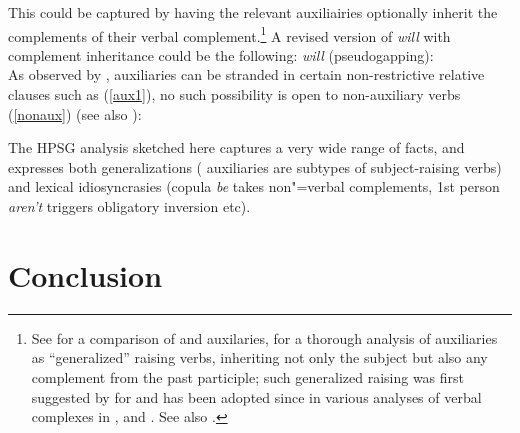 This could be captured by having the relevant auxiliairies optionally inherit the complements of their verbal complement.\footnote{See  for a comparison of  and  auxilaries,  for a thorough analysis of  auxiliaries as ``generalized'' raising verbs, inheriting not only the subject but also any complement from the past participle; such generalized raising was first suggested by \citet{HN89a,HN94a} for  and has been adopted since in various analyses of verbal complexes in  \citep{Kiss95a,Meurers2000b,Kathol2001a,Mueller99a,Mueller2002b},  \citep{BvN98a} and  \citep[Section~4]{MuellerPersian}. See also .}
A revised version of \emph{will} with complement inheritance could be the following:
\ea
\emph{will} (pseudogapping):\\
\z
As observed by \citet{ArnoldandBorsley2008}, auxiliaries can be stranded in certain non-restrictive
relative clauses such as (\ref{aux1}), no such possibility is open to non-auxiliary verbs
(\ref{nonaux}) (see also \crossrefchapteralt[\page \pageref{page-relative-clauses:stranded-aux}]{relative-clauses}):

\eal
{}
\zl

The HPSG analysis sketched here captures a very wide range of facts, and expresses both generalizations ( auxiliaries are subtypes of subject-raising verbs) and lexical idiosyncrasies (copula \emph{be} takes non"=verbal complements, 1st person \emph{aren't} triggers obligatory inversion etc).


	
\section{Conclusion}

